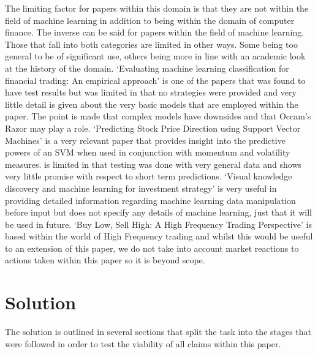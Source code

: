 \documentclass[conference]{IEEEtran}
\begin{document}
The limiting factor for papers within this domain is that they are not within the field of machine learning in addition to being within the domain of computer finance. The inverse can be said for papers within the field of machine learning. Those that fall into both categories are limited in other ways. Some being too general to be of significant use, others being more in line with an academic look at the history of the domain. `Evaluating machine learning classification for financial trading: An empirical approach' \cite{Gerlein2016} is one of the papers that was found to have test results but was limited in that no strategies were provided and very little detail is given about the very basic models that are employed within the paper. The point is made that complex models have downsides and that Occam's Razor may play a role. `Predicting Stock Price Direction using Support Vector Machines' \cite{MadgeAdvisor} is a very relevant paper that provides insight into the predictive powers of an SVM when used in conjunction with momentum and volatility measures. \cite{MadgeAdvisor} is limited in that testing was done with very general data and shows very little promise with respect to short term predictions. `Visual knowledge discovery and machine learning for investment strategy' \cite{Wilinski2017} is very useful in providing detailed information regarding machine learning data manipulation before input but does not specify any details of machine learning, just that it will be used in future. `Buy Low, Sell High: A High Frequency Trading Perspective' \cite{Cartea2014} is based within the world of High Frequency trading and whilst this would be useful to an extension of this paper, we do not take into account market reactions to actions taken within this paper so it is beyond scope.

\section{Solution}

The solution is outlined in several sections that split the task into the stages that were followed in order to test the viability of all claims within this paper.
\end{document}

